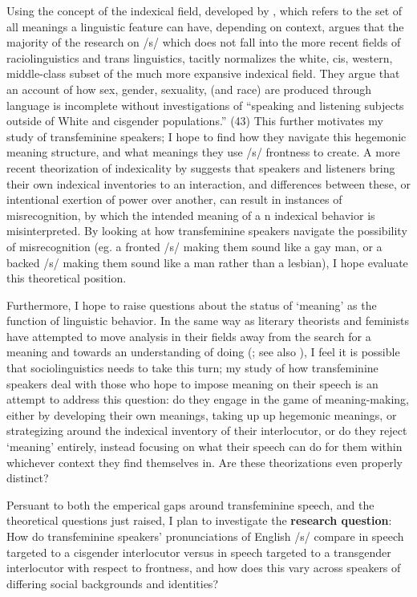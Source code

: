 Using the concept of the indexical field, developed by \textcite{eckert_variation_2008}, which refers to the set of all meanings a linguistic feature can have, depending on context,  \textcite{calder_whose_2021} argues that the majority of the research on /s/ which does not fall into the more recent fields of raciolinguistics and trans linguistics, tacitly normalizes the white, cis, western, middle-class subset of the much more expansive indexical field. They argue that an account of how sex, gender, sexuality, (and race) are produced through language is incomplete without investigations of ``speaking and listening subjects outside of White and cisgender populations.'' (43) This further motivates my study of transfeminine speakers; I hope to find how they navigate this hegemonic meaning structure, and what meanings they use /s/ frontness to create. A more recent theorization of indexicality by \textcite{barrett_sexuality_2024} suggests that speakers and listeners bring their own indexical inventories to an interaction, and differences between these, or intentional exertion of power over another, can result in instances of misrecognition, by which the intended meaning of a n indexical behavior is misinterpreted. By looking at how transfeminine speakers navigate the possibility of misrecognition (eg. a fronted /s/ making them sound like a gay man, or a backed /s/ making them sound like a man rather than a lesbian), I hope evaluate this theoretical position.

Furthermore, I hope to raise questions about the status of `meaning' as the function of linguistic behavior. In the same way as literary theorists and feminists have attempted to move analysis in their fields away from the search for a meaning and towards an understanding of doing (\cite{deleuze_november_1987, butler_gender_1990}; see also \cite{livia_its_1997}), I feel it is possible that sociolinguistics needs to take this turn; my study of how transfeminine speakers deal with those who hope to impose meaning on their speech is an attempt to address this question: do they engage in the game of meaning-making, either by developing their own meanings, taking up up hegemonic meanings, or strategizing around the indexical inventory of their interlocutor, or do they reject `meaning' entirely, instead focusing on what their speech can do for them within whichever context they find themselves in. Are these theorizations even properly distinct?


Persuant to both the emperical gaps around transfeminine speech, and the theoretical questions just raised, I plan to investigate the \textbf{research question}: How do transfeminine speakers' pronunciations of English /s/ compare in speech targeted to a cisgender interlocutor versus in speech targeted to a transgender interlocutor with respect to frontness, and how does this vary across speakers of differing social backgrounds and identities?
       

